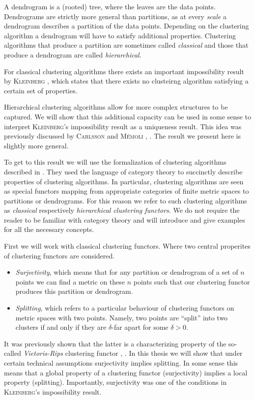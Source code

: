 A dendrogram is a (rooted) tree, where the leaves are the data points. Dendrograms are strictly more general than partitions, as at every \emph{scale} a dendrogram describes a partition of the data points.
Depending on the clustering algorithm a dendrogram will have to satisfy additional properties.
Clustering algorithms that produce a partition are sometimes called \emph{classical} and those that produce a dendrogram are called \emph{hierarchical}.


For classical clustering algorithms there exists an important impossibility result by \textsc{Kleinberg} \cite{Kleinberg2002}, which states that there exists no clusteirng algorithm satisfying a certain set of properties.

Hierarchical clustering algorithms allow for more complex structures to be captured. We will show that this additional capacity can be used in some sense to interpret \textsc{Kleinberg}'s impossibility result as a uniqueness result. This idea was previously discussed by \textsc{Carlsson} and \textsc{M\'emoli} \cite{JMLR:v11:carlsson10a}, \cite{Carlsson2010}. The result we present here is slightly more general.

To get to this result we will use the formalization of clustering algorithms described in \cite{Carlsson2010}. They used the language of category theory to succinctly describe properties of clustering algorithms. In particular, clustering algorithms are seen as special functors mapping from appropriate categories of finite metric spaces to partitions or dendrograms. For this reason we refer to such clustering algorithms as \emph{classical} respectively \emph{hierarchical clustering functors}. We do not require the reader to be familiar with category theory and will introduce and give examples for all the necessary concepts.

First we will work with classical clustering functors. Where two central properites of clustering functors are considered.
\begin{itemize}
    \item \emph{Surjectivity}, which means that for any partition or dendrogram of a set of $n$ points we can find a metric on these $n$ points such that our clustering functor produces this partition or dendrogram.
    \item \emph{Splitting}, which refers to a particular behaviour of clustering functors on metric spaces with two points. Namely, two points are ``split'' into two clusters if and only if they are $\delta$-far apart for some $\delta > 0$.
\end{itemize}
It was previously shown that the latter is a characterizing property of the so-called \emph{Vietoris-Rips} clustering functor \cite{JMLR:v11:carlsson10a}, \cite{Carlsson2010}.
In this thesis we will show that under certain technical assumptions surjectivity implies splitting. In some sense this means that a global property of a clustering functor (surjectivity) implies a local property (splitting). Importantly, surjectivity was one of the conditions in \textsc{Kleinberg}'s impossibility result.


